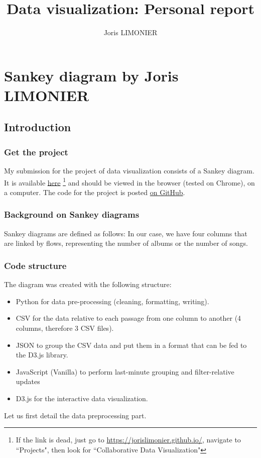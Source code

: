 \documentclass{article}
\title{Data visualization: Personal report}
\author{Joris LIMONIER}
\begin{document}
\maketitle

\tableofcontents
\newpage

\section{Sankey diagram by Joris LIMONIER}

\subsection{Introduction}
\subsubsection{Get the project}
My submission for the project of data visualization consists of a Sankey diagram. It is available \href{https://jorislimonier.github.io/projects/collab-data-vis/index.html}{here} \footnote{If the link is dead, just go to \href{https://jorislimonier.github.io/}{https://jorislimonier.github.io/}, navigate to ``Projects", then look for ``Collaborative Data Visualization"} and should be viewed in the browser (tested on Chrome), on a computer. The code for the project is posted \href{https://github.com/jorislimonier/collab-viz/tree/main/joris}{on GitHub}.

\subsubsection{Background on Sankey diagrams}
Sankey diagrams are defined as follows:  \cite{noauthor_sankey_2021} In our case, we have four columns that are linked by flows, representing the number of albums or the number of songs.

\subsubsection{Code structure}
The diagram was created with the following structure:

\begin{itemize}
    \item Python \cite{van2000python} for data pre-processing (cleaning, formatting, writing).
    \item CSV for the data relative to each passage from one column to another (4 columns, therefore 3 CSV files).
    \item JSON to group the CSV data and put them in a format that can be fed to the D3.js library.
    \item JavaScript (Vanilla) to perform last-minute grouping and filter-relative updates
    \item D3.js \cite{bostock_d_2011} for the interactive data visualization.
\end{itemize}
Let us first detail the data preprocessing part.
\end{document}
